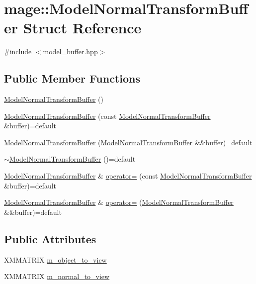 \hypertarget{structmage_1_1_model_normal_transform_buffer}{}\section{mage\+:\+:Model\+Normal\+Transform\+Buffer Struct Reference}
\label{structmage_1_1_model_normal_transform_buffer}


{\ttfamily \#include $<$model\+\_\+buffer.\+hpp$>$}

\subsection*{Public Member Functions}
\begin{DoxyCompactItemize}
\item 
\hyperlink{structmage_1_1_model_normal_transform_buffer_a0ab367c167f3056d32ad06299d9953d0}{Model\+Normal\+Transform\+Buffer} ()
\item 
\hyperlink{structmage_1_1_model_normal_transform_buffer_a2718abe76ffc0d6cd278aad9d4020429}{Model\+Normal\+Transform\+Buffer} (const \hyperlink{structmage_1_1_model_normal_transform_buffer}{Model\+Normal\+Transform\+Buffer} \&buffer)=default
\item 
\hyperlink{structmage_1_1_model_normal_transform_buffer_a415530ed6d4a2bd31424b11af6b1ebee}{Model\+Normal\+Transform\+Buffer} (\hyperlink{structmage_1_1_model_normal_transform_buffer}{Model\+Normal\+Transform\+Buffer} \&\&buffer)=default
\item 
\hyperlink{structmage_1_1_model_normal_transform_buffer_a157d1f7cc47463f6b589d25c039ec418}{$\sim$\+Model\+Normal\+Transform\+Buffer} ()=default
\item 
\hyperlink{structmage_1_1_model_normal_transform_buffer}{Model\+Normal\+Transform\+Buffer} \& \hyperlink{structmage_1_1_model_normal_transform_buffer_ae0b033dc93145a55e5e00024f8f95330}{operator=} (const \hyperlink{structmage_1_1_model_normal_transform_buffer}{Model\+Normal\+Transform\+Buffer} \&buffer)=default
\item 
\hyperlink{structmage_1_1_model_normal_transform_buffer}{Model\+Normal\+Transform\+Buffer} \& \hyperlink{structmage_1_1_model_normal_transform_buffer_acc27af2e1e65994a43e1d804aa25bb5a}{operator=} (\hyperlink{structmage_1_1_model_normal_transform_buffer}{Model\+Normal\+Transform\+Buffer} \&\&buffer)=default
\end{DoxyCompactItemize}
\subsection*{Public Attributes}
\begin{DoxyCompactItemize}
\item 
X\+M\+M\+A\+T\+R\+IX \hyperlink{structmage_1_1_model_normal_transform_buffer_afd0823b56d399f56245a5e652b25e6d5}{m\+\_\+object\+\_\+to\+\_\+view}
\item 
X\+M\+M\+A\+T\+R\+IX \hyperlink{structmage_1_1_model_normal_transform_buffer_a1d79f8570b8bc020406e007f30bcfb13}{m\+\_\+normal\+\_\+to\+\_\+view}
\end{DoxyCompactItemize}



